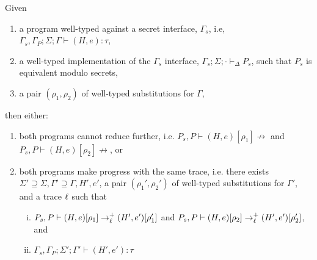 \begin{theorem}
  Given
  \begin{enumerate}
  \item a program well-typed against a secret interface, $\Gamma_s$,
    i.e, $\Gamma_s, \Gamma_P; \Sigma; \Gamma \vdash (H, e) : \tau$,
    
  \item a well-typed implementation of the $\Gamma_s$ interface,
    $\Gamma_s; \Sigma; \cdot \vdash_{\Delta} P_s$, such that $P_s$ is
    equivalent modulo secrets,

  \item a pair $(\rho_1, \rho_2)$ of well-typed substitutions for $\Gamma$,
  \end{enumerate}
  
  then either:
  \begin{enumerate}
    \item 
      both programs cannot reduce further, i.e.
      $P_s, P \vdash (H, e)[\rho_1] \nrightarrow$
      and
      $P_s, P \vdash (H, e)[\rho_2] \nrightarrow$, or
    \item 
      both programs make progress with the same trace, i.e.
      there exists $\Sigma' \supseteq \Sigma, \Gamma' \supseteq \Gamma,
      H', e'$, a pair $(\rho_1', \rho_2')$ of well-typed substitutions
      for $\Gamma'$, and a trace $\ell$ such that

  \begin{enumerate}[i)]
  \item
         $P_s, P \vdash (H, e)[\rho_1] \rightarrow^{+}_{\ell} (H', e')[\rho'_1]$
         and
         $P_s, P \vdash (H, e)[\rho_2] \rightarrow^{+}_{\ell} (H', e')[\rho'_2]$, and
  \item  $\Gamma_s, \Gamma_P; \Sigma'; \Gamma' \vdash (H', e') : \tau$
  \end{enumerate}
  \end{enumerate}
\end{theorem}  
         
   




